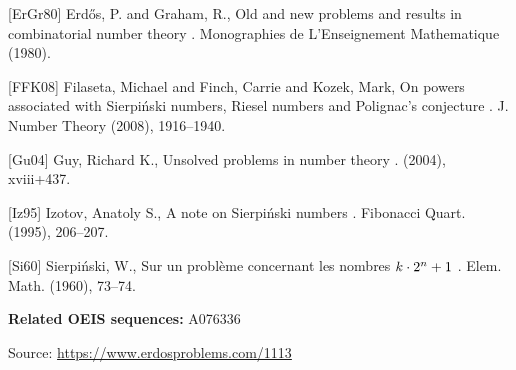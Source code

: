 \documentclass{article}
\begin{document}
[ErGr80] Erd\H{o}s, P. and Graham, R., Old and new problems and results in combinatorial number theory . Monographies de L'Enseignement Mathematique (1980).

[FFK08] Filaseta, Michael and Finch, Carrie and Kozek, Mark, On powers associated with Sierpi\'nski numbers, {R}iesel numbers and {P}olignac's conjecture . J. Number Theory (2008), 1916--1940.

[Gu04] Guy, Richard K., Unsolved problems in number theory . (2004), xviii+437.

[Iz95] Izotov, Anatoly S., A note on Sierpi\'nski numbers . Fibonacci Quart. (1995), 206--207.

[Si60] Sierpi\'nski, W., Sur un probl\`eme concernant les nombres {$k\cdot 2\sp{n}+1$} . Elem. Math. (1960), 73--74.

\noindent\textbf{Related OEIS sequences:} A076336


\bigskip
\noindent\small{Source: \url{https://www.erdosproblems.com/1113}}
\end{document}
